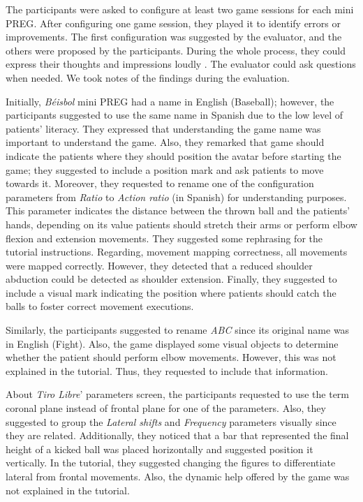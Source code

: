 The participants were asked to configure at least two game sessions for each mini \ac{PREG}. After configuring one game session, they played it to identify errors or improvements. The first configuration was suggested by the evaluator, and the others were proposed by the participants. During the whole process, they could express their thoughts and impressions loudly . The evaluator could ask questions when needed. We took notes of the findings during the evaluation.

Initially, \textit{Béisbol} mini \ac{PREG} had a name in English (Baseball); however, the participants suggested to use the same name in Spanish due to the low level of patients' literacy. They expressed that understanding the game name was important to understand the game. Also, they remarked that game should indicate the patients where they should position the avatar before starting the game; they suggested to include a position mark and ask patients to move towards it. Moreover, they requested to rename one of the configuration parameters from \textit{Ratio} to \textit{Action ratio} (in Spanish) for understanding purposes. This parameter indicates the distance between the thrown ball and the patients' hands, depending on its value patients should stretch their arms or perform elbow flexion and extension movements. They suggested some rephrasing for the tutorial instructions. Regarding, movement mapping correctness, all movements were mapped correctly. However, they detected that a reduced shoulder abduction could be detected as shoulder extension. Finally, they suggested to include a visual mark indicating the position where patients should catch the balls to foster correct movement executions.

Similarly, the participants suggested to rename \textit{ABC} since its original name was in English (Fight). Also, the game displayed some visual objects to determine whether the patient should perform elbow movements. However, this was not explained in the tutorial. Thus, they requested to include that information.

About \textit{Tiro Libre}' parameters screen, the participants requested to use the term coronal plane instead of frontal plane for one of the parameters. Also, they suggested to group the \textit{Lateral shifts} and \textit{Frequency} parameters visually since they are related. Additionally, they noticed that a bar that represented the final height of a kicked ball was placed horizontally and suggested position it vertically. In the tutorial, they suggested changing the figures to differentiate lateral from frontal movements. Also, the dynamic help offered by the game was not explained in the tutorial.

